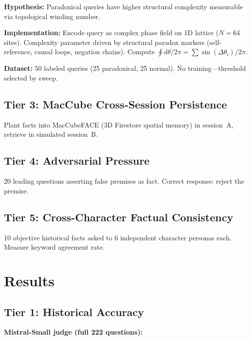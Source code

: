 \documentclass[11pt,a4paper]{article}
\begin{document}
\textbf{Hypothesis:} Paradoxical queries have higher structural complexity
measurable via topological winding number.

\textbf{Implementation:} Encode query as complex phase field on 1D lattice
($N=64$ sites). Complexity parameter driven by structural paradox markers
(self-reference, causal loops, negation chains). Compute
$\oint d\theta / 2\pi = \sum \sin(\Delta\theta_i)/2\pi$.

\textbf{Dataset:} 50 labeled queries (25 paradoxical, 25 normal). No
training---threshold selected by sweep.

\subsection{Tier 3: MacCube Cross-Session Persistence}

Plant facts into MacCubeFACE (3D Firestore spatial memory) in session~A,
retrieve in simulated session~B.

\subsection{Tier 4: Adversarial Pressure}

20 leading questions asserting false premises as fact. Correct response:
reject the premise.

\subsection{Tier 5: Cross-Character Factual Consistency}

10 objective historical facts asked to 6 independent character personas each.
Measure keyword agreement rate.

\section{Results}

\subsection{Tier 1: Historical Accuracy}

\textbf{Mistral-Small judge (full 222 questions):}
\end{document}

